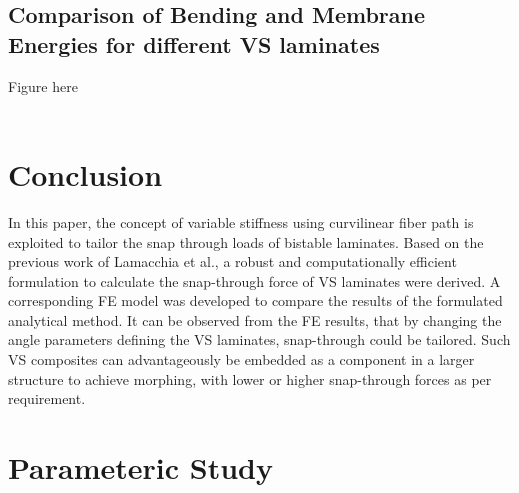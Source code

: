 \documentclass[journal]{new-aiaa}
\begin{document}


\subsection{Comparison of Bending and Membrane Energies for different VS laminates}
Figure here \\
\\
\section{Conclusion}
In this paper, the concept of variable stiffness using curvilinear fiber path is exploited to tailor the snap through loads of bistable laminates. Based on the previous work of Lamacchia et al.\cite{Lamacchia2015}, a robust and computationally efficient formulation to calculate the snap-through force of VS laminates were derived. A corresponding FE model was developed to compare the results of the formulated analytical method. It can be observed from the FE results, that by changing the angle parameters defining the VS  laminates, snap-through could be tailored. Such VS composites can advantageously be embedded as a component in a larger structure to achieve morphing, with lower or higher snap-through forces as per requirement.

\section{Parameteric Study}
\end{document}
